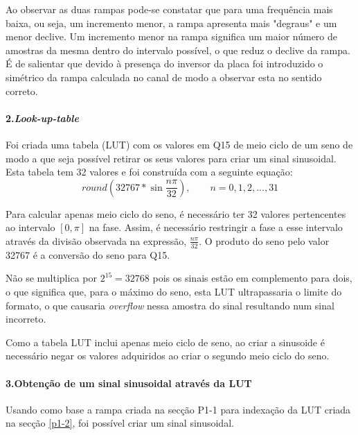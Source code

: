 \documentclass[11pt]{article}
\numberwithin{equation}{section}
\begin{document}
Ao observar as duas rampas pode-se constatar que para uma frequência mais baixa, ou seja, um incremento menor, a rampa apresenta mais "degraus" e um menor declive. Um incremento menor na rampa significa um maior número de amostras da mesma dentro do intervalo possível, o que reduz o declive da rampa. É de salientar que devido à presença do inversor da placa foi introduzido o simétrico da rampa calculada no canal de modo a observar esta no sentido correto.
\paragraph{2.\textit{Look-up-table}} \hspace{0pt}
\label{p1-2}

Foi criada uma tabela (LUT) com os valores em Q15 de meio ciclo de um seno de modo a que seja possível retirar os seus valores para criar um sinal sinusoidal. Esta tabela tem 32 valores e foi construída com a seguinte equação:
\begin{equation}
round \left(32767*\sin \dfrac{n \pi}{32} \right),  \quad \quad n=0,1,2,...,31
\end{equation}

Para calcular apenas meio ciclo do seno, é necessário ter 32 valores pertencentes ao intervalo $[0,\pi]$ na fase. Assim, é necessário restringir a fase a esse intervalo através da divisão observada na expressão, $\frac{n \pi}{32}$. O produto do seno pelo valor 32767 é a conversão do seno para Q15. 

Não se multiplica por $2 ^{15}=32768$ pois os sinais estão em complemento para dois, o que significa que, para o máximo do seno, esta LUT ultrapassaria o limite do formato, o que causaria \textit{overflow} nessa amostra do sinal resultando num sinal incorreto.

Como a tabela LUT inclui apenas meio ciclo de seno, ao criar a sinusoide é necessário negar os valores adquiridos ao criar o segundo meio ciclo do seno.

\paragraph{3.Obtenção de um sinal sinusoidal através da LUT} \hspace{0pt}
\label{p1-3}

Usando como base a rampa criada na secção P1-1 para indexação da LUT criada na secção \ref{p1-2}, foi possível criar um sinal  sinusoidal.
                                                      
\end{document}
